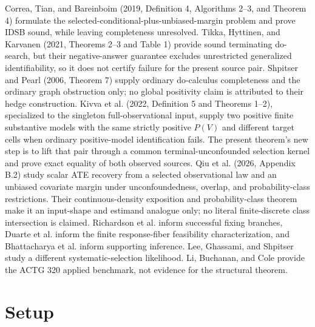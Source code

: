 \documentclass{article}
\begin{document}
Correa, Tian, and Bareinboim (2019, Definition 4, Algorithms 2--3, and Theorem 4) formulate the selected-conditional-plus-unbiased-margin problem and prove IDSB sound, while leaving completeness unresolved. Tikka, Hyttinen, and Karvanen (2021, Theorems 2--3 and Table 1) provide sound terminating do-search, but their negative-answer guarantee excludes unrestricted generalized identifiability, so it does not certify failure for the present source pair. Shpitser and Pearl (2006, Theorem 7) supply ordinary do-calculus completeness and the ordinary graph obstruction only; no global positivity claim is attributed to their hedge construction. Kivva et al. (2022, Definition 5 and Theorems 1--2), specialized to the singleton full-observational input, supply two positive finite substantive models with the same strictly positive \(P(V)\) and different target cells when ordinary positive-model identification fails. The present theorem's new step is to lift that pair through a common terminal-unconfounded selection kernel and prove exact equality of both observed sources. Qiu et al. (2026, Appendix B.2) study scalar ATE recovery from a selected observational law and an unbiased covariate margin under unconfoundedness, overlap, and probability-class restrictions. Their continuous-density exposition and probability-class theorem make it an input-shape and estimand analogue only; no literal finite-discrete class intersection is claimed. Richardson et al. inform successful fixing branches, Duarte et al. inform the finite response-fiber feasibility characterization, and Bhattacharya et al. inform supporting inference. Lee, Ghassami, and Shpitser study a different systematic-selection likelihood. Li, Buchanan, and Cole provide the ACTG 320 applied benchmark, not evidence for the structural theorem.

\section{Setup}
\end{document}
